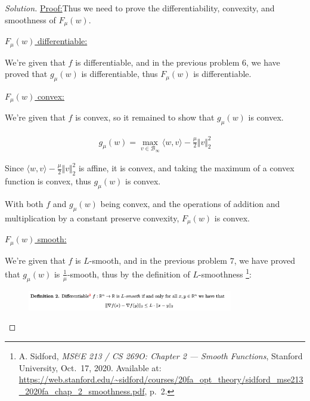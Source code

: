 \documentclass{article}
\newenvironment{solution}
  {\renewcommand\qedsymbol{$\blacksquare$}\begin{proof}[Solution]}
  {\end{proof}}
\newenvironment{claimproof}[1]{\par\noindent\underline{Proof:}\space#1}{}
\begin{document}
\begin{solution}
\begin{claimproof}
        Thus we need to prove the differentiability, convexity, and smoothness of $F_\mu(w)$.
        \bigskip

        \underline{$F_\mu(w)$ differentiable:}
        \bigskip

        We're given that $f$ is differentiable, and in the previous problem $6$, we have proved that $g_\mu(w)$ is differentiable, 
        thus $F_\mu(w)$ is differentiable.
        \bigskip

        \underline{$F_\mu(w)$ convex:}
        \bigskip

        We're given that $f$ is convex, so it remained to show that $g_\mu(w)$ is convex.

        \begin{align*}
            g_\mu(w) = \max_{v \in \mathcal{B}_\infty} \langle w, v \rangle - \frac{\mu}{2} \Vert v \Vert_2^2
        \end{align*}

        Since $\langle w, v \rangle - \frac{\mu}{2} \Vert v \Vert_2^2$ is affine, it is convex, 
        and taking the maximum of a convex function is convex, thus $g_\mu(w)$ is convex.
        \bigskip

        With both $f$ and $g_\mu(w)$ being convex, 
        and the operations of addition and multiplication by a constant preserve convexity, 
        $F_\mu(w)$ is convex.
        \bigskip

        \underline{$F_\mu(w)$ smooth:}
        \bigskip

        We're given that $f$ is $L$-smooth, 
        and in the previous problem $7$, we have proved that $g_\mu(w)$ is $\frac{1}{\mu}$-smooth, 
        thus by the definition of $L$-smoothness
        \footnote{A. Sidford, \textit{MS\&E 213 / CS 269O: Chapter 2 — Smooth Functions}, Stanford University, Oct.~17, 2020. Available at: \url{https://web.stanford.edu/~sidford/courses/20fa_opt_theory/sidford_mse213_2020fa_chap_2_smoothness.pdf}, p.~2.}:

        \begin{figure}[H]
            \centering
            \includegraphics[width = 0.8\textwidth]{L_smooth_def.png}
        \end{figure}

        

\end{claimproof}
\end{solution}
\end{document}
